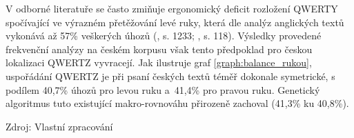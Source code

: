 \documentclass[a4paper, twoside, 12pt, czech]{article}
\begin{document}
V odborné literatuře se často zmiňuje ergonomický deficit rozložení QWERTY spočívající
ve výrazném přetěžování levé ruky, která dle analýz anglických textů vykonává až 57\space\% 
veškerých úhozů (\cite{qwerty-dilemma}, s. 1233; \cite{qwerty-immortal}, s. 118). 
Výsledky provedené frekvenční analýzy na českém korpusu však tento předpoklad pro 
českou lokalizaci QWERTZ vyvracejí. Jak ilustruje graf \ref{graph:balance_rukou}, 
uspořádání QWERTZ je při psaní českých textů téměř dokonale symetrické, s podílem 
40,7\space\% úhozů pro levou ruku a~41,4\space\% pro pravou ruku. Genetický algoritmus tuto 
existující makro-rovnováhu přirozeně zachoval (41,3\space\% ku 40,8\space\%).

\begin{graph}[h!]
    \centering
    \caption{Srovnání vyváženosti zátěže rukou u rozložení QWERTY a GA}
    \vspace{0.5cm}
    
    \label{graph:balance_rukou}
    \small{Zdroj: Vlastní zpracování}
\end{graph}
\end{document}
